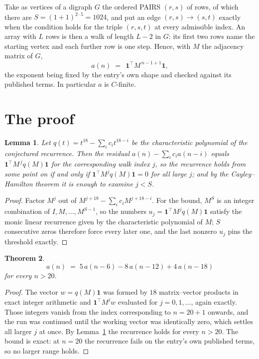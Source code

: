 \documentclass[11pt,a4paper]{article}
\theoremstyle{plain}
\newtheorem{theorem}{Theorem}
\newtheorem{lemma}[theorem]{Lemma}
\theoremstyle{definition}
\begin{document}
Take as vertices of a digraph $G$ the ordered PAIRS $(r,s)$ of rows, of which there are
$S=(1+1)^{2\cdot5}=1024$, and put an edge $(r,s)\to(s,t)$ exactly when the condition
holds for the triple $(r,s,t)$ at every admissible index. An array with $L$ rows is then a
walk of length $L-2$ in $G$: its first two rows name the starting vertex and each further
row is one step. Hence, with $M$ the adjacency matrix of $G$,
\[
a(n)\;=\;\,\mathbf{1}^{\!\top}M^{\,n-1+1}\mathbf{1},
\]
the exponent being fixed by the entry's own shape and checked against its published terms.
In particular $a$ is $C$-finite.

\section{The proof}

\begin{lemma}\label{lem:crit}
Let $q(t)=t^{18}-\sum_i c_it^{18-i}$ be the characteristic polynomial of the
conjectured recurrence. Then the residual $a(n)-\sum_ic_ia(n-i)$ equals
$\mathbf{1}^{\!\top}M^{\,j}q(M)\mathbf{1}$ for the corresponding walk index
$j$, so the recurrence holds from some point on if and only if
$\mathbf{1}^{\!\top}M^{j}q(M)\mathbf{1}=0$ for all large $j$; and by the
Cayley--Hamilton theorem it is enough to examine $j<S$.
\end{lemma}

\begin{proof}
Factor $M^{j}$ out of $M^{j+18}-\sum_ic_iM^{j+18-i}$. For the bound, $M^{S}$
is an integer combination of $I,M,\dots,M^{S-1}$, so the numbers
$u_j=\mathbf{1}^{\!\top}M^{j}q(M)\mathbf{1}$ satisfy the monic linear recurrence given by
the characteristic polynomial of $M$; $S$ consecutive zeros therefore force every later one,
and the last nonzero $u_j$ pins the threshold exactly.
\end{proof}

\begin{theorem}
\[
a(n)\;=\;5\,a(n-6) - 8\,a(n-12) + 4\,a(n-18)
\]
for every $n>20$.
\end{theorem}

\begin{proof}
The vector $w=q(M)\mathbf{1}$ was formed by $18$ matrix--vector products in exact
integer arithmetic and $\mathbf{1}^{\!\top}M^{j}w$ evaluated for $j=0,1,\dots$, again
exactly. Those integers vanish from the index corresponding to $n=20+1$ onwards, and the
run was continued until the working vector was identically zero, which settles all larger $j$
at once. By Lemma~\ref{lem:crit} the recurrence holds for every $n>20$. The bound is exact: at $n=20$ the recurrence fails on the entry's own published terms, so no larger range holds.
\end{proof}
\end{document}
